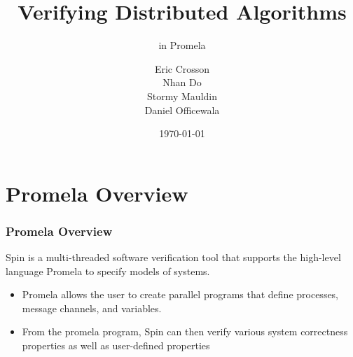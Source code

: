 \documentclass[t, pdftex]{beamer}
\title{Verifying Distributed Algorithms}
\subtitle{in Promela}
\author{Eric Crosson \\ Nhan Do \\ Stormy Mauldin \\ Daniel Officewala}
\institute{EE 360P}
\date{\today}
\begin{document}
\titleframe



\section{Promela Overview}
\begin{frame}
    \frametitle{Promela Overview}
    Spin is a multi-threaded software verification tool that supports the
    high-level language Promela to specify models of systems.
    \begin{itemize}
    \item Promela allows the user to create parallel programs that define
      processes, message channels, and variables.
    \item From the promela program, Spin can then verify various system
      correctness properties as well as user-defined properties
    \end{itemize}
\end{frame}
\end{document}

